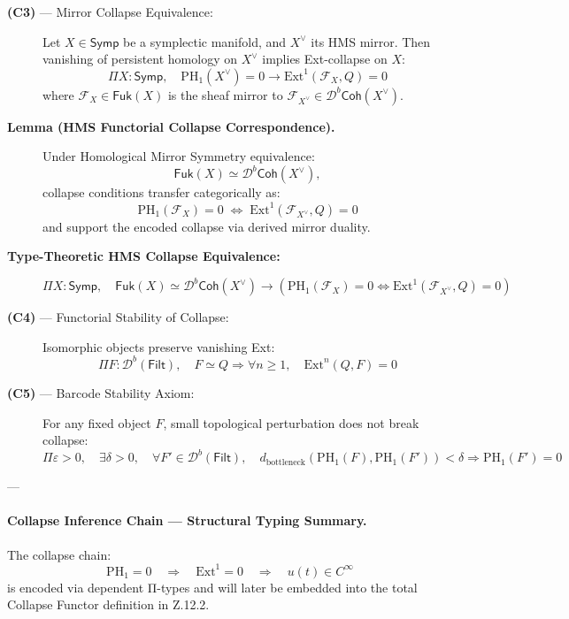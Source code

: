 \documentclass[11pt]{article}
\begin{document}
\begin{axiom}
\begin{axiom}
{{\begin{description}
  \item[\textbf{(C3)} — Mirror Collapse Equivalence:]  
  Let \( X \in \mathsf{Symp} \) be a symplectic manifold, and \( X^\vee \) its HMS mirror.  
  Then vanishing of persistent homology on \( X^\vee \) implies Ext-collapse on \( X \):
  \[
  \Pi X : \mathsf{Symp},\quad \mathrm{PH}_1(X^\vee) = 0 \rightarrow \mathrm{Ext}^1(\mathcal{F}_{X}, Q) = 0
  \]
  where \( \mathcal{F}_X \in \mathsf{Fuk}(X) \) is the sheaf mirror to \( \mathcal{F}_{X^\vee} \in \mathcal{D}^b\mathsf{Coh}(X^\vee) \).

  \item[\textbf{Lemma (HMS Functorial Collapse Correspondence).}]
  Under Homological Mirror Symmetry equivalence:
  \[
  \mathsf{Fuk}(X) \simeq \mathcal{D}^b\mathsf{Coh}(X^\vee),
  \]
  collapse conditions transfer categorically as:
  \[
  \mathrm{PH}_1(\mathcal{F}_X) = 0 \;\Leftrightarrow\; \mathrm{Ext}^1(\mathcal{F}_{X^\vee}, Q) = 0
  \]
  and support the encoded collapse via derived mirror duality.

  \item[\textbf{Type-Theoretic HMS Collapse Equivalence:}]
  \[
  \Pi X : \mathsf{Symp},\quad \mathsf{Fuk}(X) \simeq \mathcal{D}^b\mathsf{Coh}(X^\vee) \rightarrow
  \left( \mathrm{PH}_1(\mathcal{F}_X) = 0 \Leftrightarrow \mathrm{Ext}^1(\mathcal{F}_{X^\vee}, Q) = 0 \right)
  \]

  \item[\textbf{(C4)} — Functorial Stability of Collapse:]  
  Isomorphic objects preserve vanishing Ext:
  \[
  \Pi F : \mathcal{D}^b(\mathsf{Filt}),\quad F \simeq Q \Rightarrow \forall n \geq 1,\quad \mathrm{Ext}^n(Q, F) = 0
  \]

  \item[\textbf{(C5)} — Barcode Stability Axiom:]  
  For any fixed object \( F \), small topological perturbation does not break collapse:
  \[
  \Pi \varepsilon > 0,\quad \exists \delta > 0,\quad \forall F' \in \mathcal{D}^b(\mathsf{Filt}),\quad
  d_{\text{bottleneck}}(\mathrm{PH}_1(F), \mathrm{PH}_1(F')) < \delta \Rightarrow \mathrm{PH}_1(F') = 0
  \]

\end{description}

---

\paragraph{Collapse Inference Chain — Structural Typing Summary.}

The collapse chain:
\[
\mathrm{PH}_1 = 0 \quad \Rightarrow \quad \mathrm{Ext}^1 = 0 \quad \Rightarrow \quad u(t) \in C^\infty
\]
is encoded via dependent Π-types and will later be embedded into the total Collapse Functor definition in Z.12.2.

}}
\end{axiom}
\end{axiom}
\end{document}
